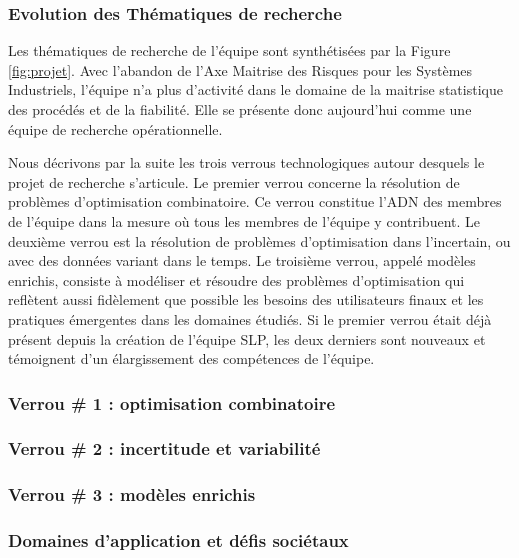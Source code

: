 		
		
		\subsubsection{Evolution des Thématiques de recherche}
		
	Les thématiques de recherche de l'équipe \slp sont synthétisées par la Figure \ref{fig:projet}. 
	Avec l'abandon de l'Axe Maitrise des Risques pour les Systèmes Industriels, l'équipe n'a plus d'activité dans le domaine de la maitrise statistique des procédés et de la fiabilité. Elle se présente donc aujourd'hui comme une équipe de recherche opérationnelle. 
	
	Nous décrivons par la suite les trois verrous technologiques autour desquels le projet de recherche s'articule. 
	Le premier verrou concerne la résolution de problèmes d'optimisation combinatoire. Ce verrou constitue l'ADN des membres de l'équipe \slp dans la mesure où tous les membres de l'équipe y contribuent. Le deuxième verrou est la résolution de problèmes d'optimisation dans l'incertain, ou avec des données variant dans le temps. Le troisième verrou, appelé modèles enrichis, consiste à modéliser et résoudre des problèmes d'optimisation qui reflètent aussi fidèlement que possible les besoins des utilisateurs finaux et les pratiques émergentes dans les domaines étudiés. Si le premier verrou était déjà présent depuis la création de l'équipe SLP, les deux derniers sont nouveaux et 
	témoignent d'un élargissement des compétences de l'équipe.
	
	
	\subsubsection*{Verrou \# 1 : optimisation combinatoire}
	
	
	
	
	\subsubsection*{Verrou \# 2 : incertitude et variabilité}
	
	\subsubsection*{Verrou \# 3 : modèles enrichis}
	
	
	\subsubsection*{Domaines d'application et défis sociétaux} 
	
